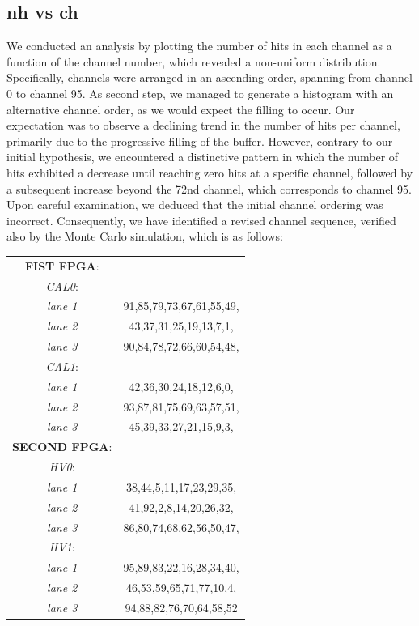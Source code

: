 \documentclass[12pt]{article}
\begin{document}
\subsection{nh vs ch}
We conducted an analysis by plotting the number of hits in each channel as a function of the channel number, which revealed a non-uniform distribution. 
Specifically, channels were arranged in an ascending order, spanning from channel 0 to channel 95.
As second step, we managed to generate a histogram with an alternative channel order, as we would expect the filling to occur.
Our expectation was to observe a declining trend in the number of hits per channel, primarily due to the progressive filling of the buffer. 
However, contrary to our initial hypothesis, we encountered a distinctive pattern in which the number of hits exhibited a decrease until reaching zero hits at a specific channel,
followed by a subsequent increase beyond the 72nd channel, which corresponds to channel 95.
Upon careful examination, we deduced that the initial channel ordering was incorrect. 
Consequently, we have identified a revised channel sequence, verified also by the Monte Carlo simulation, which is as follows:
\begin{center}
\begin{tabular}{cc}
\textbf{FIST FPGA}: & \\
\textit{CAL0}: & \\
\textit{lane 1}& 91,85,79,73,67,61,55,49,\\
\textit{lane 2}&43,37,31,25,19,13,7,1,\\
\textit{lane 3}&90,84,78,72,66,60,54,48,\\
\textit{CAL1}:&\\
\textit{lane 1}&42,36,30,24,18,12,6,0,\\
\textit{lane 2}&93,87,81,75,69,63,57,51,\\
\textit{lane 3}&45,39,33,27,21,15,9,3,\\
\textbf{SECOND FPGA}:&\\
\textit{HV0}:&\\
\textit{lane 1}&38,44,5,11,17,23,29,35,\\
\textit{lane 2}&41,92,2,8,14,20,26,32,\\
\textit{lane 3}&86,80,74,68,62,56,50,47,\\
\textit{HV1}: & \\
\textit{lane 1}&95,89,83,22,16,28,34,40,\\
\textit{lane 2}&46,53,59,65,71,77,10,4,\\
\textit{lane 3}&94,88,82,76,70,64,58,52\\
\end{tabular}
\end{center}   
\end{document}
